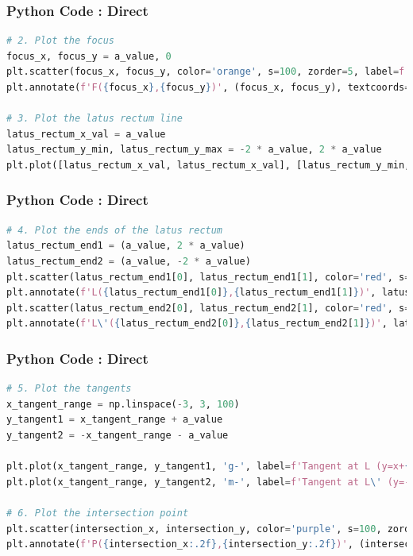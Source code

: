 \documentclass{beamer}
\begin{document}
\begin{frame}[fragile]
\frametitle{Python Code : Direct}
\begin{lstlisting}[language=Python]
# 2. Plot the focus
focus_x, focus_y = a_value, 0
plt.scatter(focus_x, focus_y, color='orange', s=100, zorder=5, label=f'Focus ({focus_x}, {focus_y})')
plt.annotate(f'F({focus_x},{focus_y})', (focus_x, focus_y), textcoords="offset points", xytext=(5,5), ha='left')

# 3. Plot the latus rectum line
latus_rectum_x_val = a_value
latus_rectum_y_min, latus_rectum_y_max = -2 * a_value, 2 * a_value
plt.plot([latus_rectum_x_val, latus_rectum_x_val], [latus_rectum_y_min, latus_rectum_y_max], 'k-', label='Latus Rectum (x=1)')
\end{lstlisting}
\end{frame}

\begin{frame}[fragile]
\frametitle{Python Code : Direct}
\begin{lstlisting}[language=Python]
# 4. Plot the ends of the latus rectum
latus_rectum_end1 = (a_value, 2 * a_value)
latus_rectum_end2 = (a_value, -2 * a_value)
plt.scatter(latus_rectum_end1[0], latus_rectum_end1[1], color='red', s=100, zorder=5, label=f'End L ({latus_rectum_end1[0]},{latus_rectum_end1[1]})')
plt.annotate(f'L({latus_rectum_end1[0]},{latus_rectum_end1[1]})', latus_rectum_end1, textcoords="offset points", xytext=(5,5), ha='left')
plt.scatter(latus_rectum_end2[0], latus_rectum_end2[1], color='red', s=100, zorder=5, label=f'End L\' ({latus_rectum_end2[0]},{latus_rectum_end2[1]})')
plt.annotate(f'L\'({latus_rectum_end2[0]},{latus_rectum_end2[1]})', latus_rectum_end2, textcoords="offset points", xytext=(5,-5), ha='right')
\end{lstlisting}
\end{frame}

\begin{frame}[fragile]
\frametitle{Python Code : Direct}
\begin{lstlisting}[language=Python]
# 5. Plot the tangents
x_tangent_range = np.linspace(-3, 3, 100)
y_tangent1 = x_tangent_range + a_value
y_tangent2 = -x_tangent_range - a_value

plt.plot(x_tangent_range, y_tangent1, 'g-', label=f'Tangent at L (y=x+{a_value})')
plt.plot(x_tangent_range, y_tangent2, 'm-', label=f'Tangent at L\' (y=-x-{a_value})')

# 6. Plot the intersection point
plt.scatter(intersection_x, intersection_y, color='purple', s=100, zorder=6, label=f'Intersection ({intersection_x:.2f},{intersection_y:.2f})')
plt.annotate(f'P({intersection_x:.2f},{intersection_y:.2f})', (intersection_x, intersection_y), textcoords="offset points", xytext=(10, -15), ha='left', color='purple', fontsize=12)
\end{lstlisting}
\end{frame}
\end{document}
